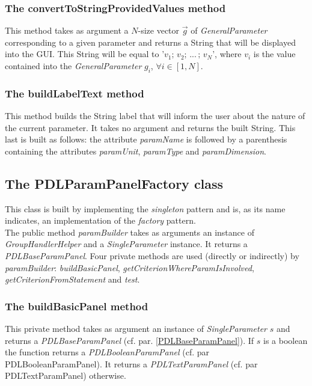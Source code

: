 \documentclass[a4paper,11pt] {ivoa}
\begin{document}
\subsubsection{The convertToStringProvidedValues method}
This method takes as argument a $N$-size vector  $\vec g$ of {\it GeneralParameter} corresponding to a given parameter and returns a String that will be displayed into the GUI. This String will be equal to '$v_1; \, v_2; \,  ...\, ;\, v_N$', where $v_i$ is the value contained into the {\it GeneralParameter} $g_i$, $\forall i \in [1,N]$.

\subsubsection{The buildLabelText method}\label{buildLabelText}
This method builds the String label that will inform the user about the nature of the current parameter. It takes no argument and returns the built String. This last is built as follows: the attribute {\it paramName} is followed by a parenthesis containing  the attributes  {\it paramUnit}, {\it paramType} and {\it paramDimension}.

\subsection{The PDLParamPanelFactory class}\label{PDLParamPanelFactory}
This class is built by implementing the {\it singleton} pattern and is, as its name indicates, an implementation of the {\it factory} pattern.\\
The public method {\it paramBuilder} takes as arguments an instance of {\it GroupHandlerHelper} and a {\it SingleParameter} instance. It returns a {\it PDLBaseParamPanel}. 
Four private methods are used (directly or indirectly) by  {\it paramBuilder}: {\it buildBasicPanel}, {\it getCriterionWhereParamIsInvolved}, {\it getCriterionFromStatement} and {\it test}.

\subsubsection{The buildBasicPanel method}
This private method takes as argument an instance of {\it SingleParameter} $s$ and returns a {\it PDLBaseParamPanel} (cf. par. \ref{PDLBaseParamPanel}). If $s$ is a boolean the function returns a {\it PDLBooleanParamPanel} (cf. par PDLBooleanParamPanel). It returns a {\it PDLTextParamPanel} (cf. par PDLTextParamPanel) otherwise.
\end{document}
